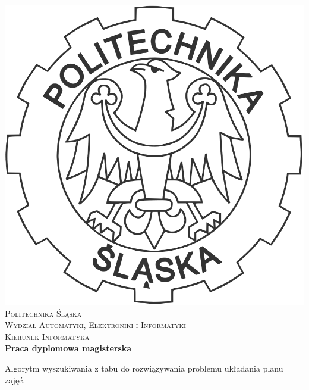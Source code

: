 
\newpage
\thispagestyle{empty}





\begin{onehalfspacing}
\begin{center}

\centering
\includegraphics[keepaspectratio,scale=0.1]{./figures/godlo.PNG} \\[.8cm]


{\fontsize{17}{17}\selectfont
\textsc{Politechnika Śląska \\[.3cm]
Wydział Automatyki, Elektroniki i Informatyki  \\[.3cm]
Kierunek Informatyka  \\[2.5cm]}
\textbf{Praca dyplomowa magisterska \\[1.7cm]}}



\large 
{Algorytm wyszukiwania z tabu do rozwiązywania problemu układania planu zajęć.} \\[3.1cm]



\end{center}
\end{onehalfspacing}
